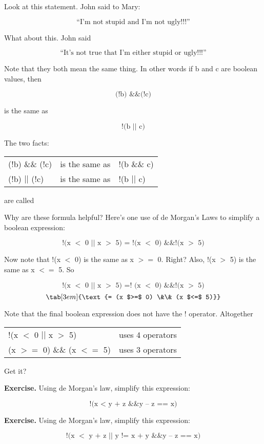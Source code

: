 {{{{{\newpage{}

Look at this statement. John said to Mary:

\[\text{“I'm not stupid and I'm not ugly!!!”}\]

What about this. John said

\[\text{“It's not true that I'm either stupid or ugly!!!”}\]

Note that they both mean the same thing. In other words if b and c are
boolean values, then

\[\text{(!b) \&\& (!c)}\]

is the same as

\[\text{!(b $||$ c)}\]

The two facts:

\begin{tabular}{p{3cm} p{3cm} p{3cm}}
(!b) \&\& (!c) & is the same as & !(b \&\& c)\\
(!b) $||$ (!c) & is the same as & !(b $||$ c)\\
\end{tabular}

are called 

Why are these formula helpful? Here's one use of de Morgan's Laws to
simplify a boolean expression:

\[\text{!(x $<$ 0 $||$ x $>$ 5) = !(x $<$ 0) \&\& !(x $>$ 5)}\]

Now note that !(x $<$ 0) is the same as x $>=$ 0. Right? Also, !(x $>$ 5) is the same as x $<=$ 5. So

\[\text{!(x $<$ 0 $||$ x $>$ 5) =! (x $<$ 0) \&\& !(x $>$ 5)}\]
\[ \tab[3em]{\text{= (x $>=$ 0) \&\& (x $<=$ 5)}}\]

Note that the final boolean expression does not have the ! operator.
Altogether

\begin{tabular}{p{5cm} p{5cm}}
!(x $<$ 0 $||$ x $>$ 5) & uses 4 operators\\
(x $>=$ 0) \&\& (x $<=$ 5) & uses 3 operators\\
\end{tabular}

Get it?

\textbf{Exercise.} Using de Morgan's law, simplify this expression:

\[\text{!(x $<$ y + z \&\& y – z == x)}\]

\textbf{Exercise.} Using de Morgan's law, simplify this expression:

\[\text{!(x $<$ y + z $||$ y != x + y \&\& y – z == x)}\]

}}}}}
